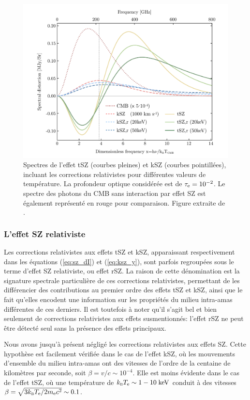 \begin{figure}[t]
    \centering
    \includegraphics[width=.8\linewidth, trim={0cm 0cm 0cm 1cm}, clip]{Figures/Chap_amas/sz_tony.pdf}
    \caption{
        Spectres de l'effet tSZ (courbes pleines) et kSZ (courbes pointillées), incluant les corrections relativistes pour différentes valeurs de température.
        La profondeur optique considérée est de $\tau_{\rm e} = 10^{-2}$.
        Le spectre des photons du CMB sans interaction par effet SZ est également représenté en rouge pour comparaison.
        Figure extraite de \cite{mroczkowski_astrophysics_2019}.
    }
    \label{fig:krsz_spec}
\end{figure}

\subsubsection{L'effet SZ relativiste} %
Les corrections relativistes aux effets tSZ et kSZ, apparaissant respectivement dans les équations (\ref{eq:sz_dI}) et (\ref{eq:ksz_y}), sont parfois regroupées sous le terme d'effet SZ relativiste, ou effet rSZ.
La raison de cette dénomination est la signature spectrale particulière de ces corrections relativistes, permettant de les différencier des contributions au premier ordre des effets tSZ et kSZ, ainsi que le fait qu'elles encodent une information sur les propriétés du milieu intra-amas différentes de ces derniers.
Il est toutefois à noter qu'il s'agit bel et bien seulement de corrections relativistes aux effets susmentionnés: l'effet rSZ ne peut être détecté seul sans la présence des effets principaux.

Nous avons jusqu'à présent négligé les corrections relativistes aux effets SZ.
Cette hypothèse est facilement vérifiée dans le cas de l'effet kSZ, où les mouvements d'ensemble du milieu intra-amas ont des vitesses de l'ordre de la centaine de kilomètres par seconde, soit $\beta = v/c \sim 10^{-4}$.
Elle est moins évidente dans le cas de l'effet tSZ, où une température de $k_\textsc{b} T_{\rm e} \sim 1-10 \;{\rm keV}$ conduit à des vitesses\footnotemark $\beta = \sqrt{3 k_\textsc{b} T_{\rm e} / 2 m_{\rm e} c^2} \sim 0.1$.

